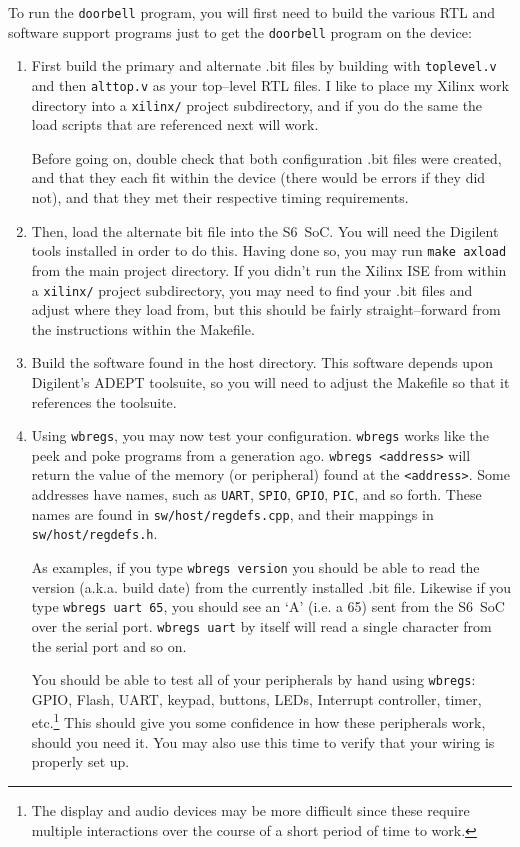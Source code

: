 \documentclass{gqtekspec}
\begin{document}
To run the {\tt doorbell} program, you will first need to build the various
RTL and software support programs just to get the {\tt doorbell} program on
the device:
\begin{enumerate}
\item First build the primary and alternate .bit files by building with
	{\tt toplevel.v} and then {\tt alttop.v} as your top--level RTL files.
	I like to place my Xilinx work directory into a {\tt xilinx/} project
	subdirectory, and if you do the same the load scripts that are
	referenced next will work.

	Before going on, double check that both configuration .bit files were
	created, and that they each fit within the device (there would be errors
	if they did not), and that they met their respective timing
	requirements.

\item Then, load the alternate bit file into the S6~SoC.  You will need
	the Digilent tools installed in order to do this.  Having done so,
	you may run {\tt make axload} from the main project directory.
	If you didn't run the Xilinx ISE from within a {\tt xilinx/} project
	subdirectory,
	you may need to find your .bit files and adjust where they load
	from, but this should be fairly straight--forward from the instructions
	within the Makefile.
\item Build the software found in the host directory.  This software depends
	upon Digilent's ADEPT toolsuite, so you will need to adjust the
	Makefile so that it references the toolsuite.

\item Using {\tt wbregs}, you may now test your configuration.  {\tt wbregs}
	works like the peek and poke programs from a generation ago.
	{\tt wbregs <address>} will return the value of the memory (or
	peripheral) found at the {\tt <address>}.  Some addresses have names,
	such as {\tt UART}, {\tt SPIO}, {\tt GPIO}, {\tt PIC}, and so forth.
	These names are found in {\tt sw/host/regdefs.cpp}, and their
	mappings in {\tt sw/host/regdefs.h}.

	As examples, if you type {\tt wbregs version} you should be able
	to read the version (a.k.a. build date) from the currently installed
	.bit file.  Likewise if you type {\tt wbregs uart 65}, you should see
	an `A' (i.e. a 65) sent from the S6~SoC over the serial port.
	{\tt wbregs uart} by itself will read a single character from the
	serial port and so on.

	You should be able to test all of your peripherals by hand using
	{\tt wbregs}: GPIO, Flash, UART, keypad, buttons, LEDs, Interrupt
	controller, timer, etc.\footnote{The display and audio devices may be
	more difficult since these require multiple interactions over the
	course of a short period of time to work.}  This should give you some
	confidence in how these peripherals work, should you need it.  You
	may also use this time to verify that your wiring is properly set up.


\end{enumerate}
\end{document}
